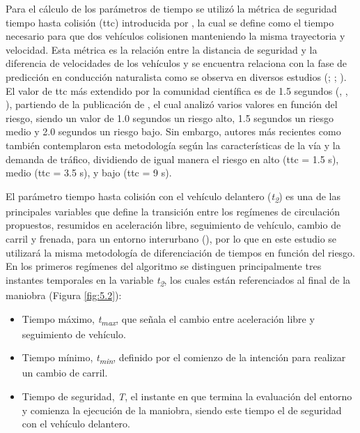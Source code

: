 Para el cálculo de los parámetros de tiempo se utilizó la métrica de seguridad tiempo hasta colisión (\gls{ttc}) introducida por \textcite{hayward}, la cual se define como el tiempo necesario para que dos vehículos colisionen manteniendo la misma trayectoria y velocidad. Esta métrica es la relación entre la distancia de seguridad y la diferencia de velocidades de los vehículos y se encuentra relaciona con la fase de predicción en conducción naturalista como se observa en diversos estudios (\cite{li16}; \cite{kilicarslan}; \cite{li22b}). El valor de \gls{ttc} más extendido por la comunidad científica es de 1.5 segundos (\cite{gallelli}, \cite{xu}, \cite{papadoulis}), partiendo de la publicación de \textcite{sayed}, el cual analizó varios valores en función del riesgo, siendo un valor de 1.0 segundos un riesgo alto, 1.5 segundos un riesgo medio y 2.0 segundos un riesgo bajo. Sin embargo, autores más recientes como \textcite{yang20} también contemplaron esta metodología según las características de la vía y la demanda de tráfico, dividiendo de igual manera el riesgo en alto (\gls{ttc} = 1.5 s), medio (\gls{ttc} = 3.5 s), y bajo (\gls{ttc} = 9 s).  

El parámetro tiempo hasta colisión con el vehículo delantero (\emph{t\textsubscript{2}}) es una de las principales variables que define la transición entre los regímenes de circulación propuestos, resumidos en aceleración libre, seguimiento de vehículo, cambio de carril y frenada, para un entorno interurbano (\cite{sharma17}), por lo que en este estudio se utilizará la misma metodología de diferenciación de tiempos en función del riesgo. En los primeros regímenes del algoritmo se distinguen principalmente tres instantes temporales en la variable \emph{t\textsubscript{2}}, los cuales están referenciados al final de la maniobra (Figura \ref{fig:5.2}): 

\begin{itemize}
    \item Tiempo máximo, \emph{t\textsubscript{max}}, que señala el cambio entre aceleración libre y seguimiento de vehículo. 
    \item Tiempo mínimo, \emph{t\textsubscript{min}}, definido por el comienzo de la intención para realizar un cambio de carril. 
    \item Tiempo de seguridad, \emph{T}, el instante en que termina la evaluación del entorno y comienza la ejecución de la maniobra, siendo este tiempo el de seguridad con el vehículo delantero.
\end{itemize}

